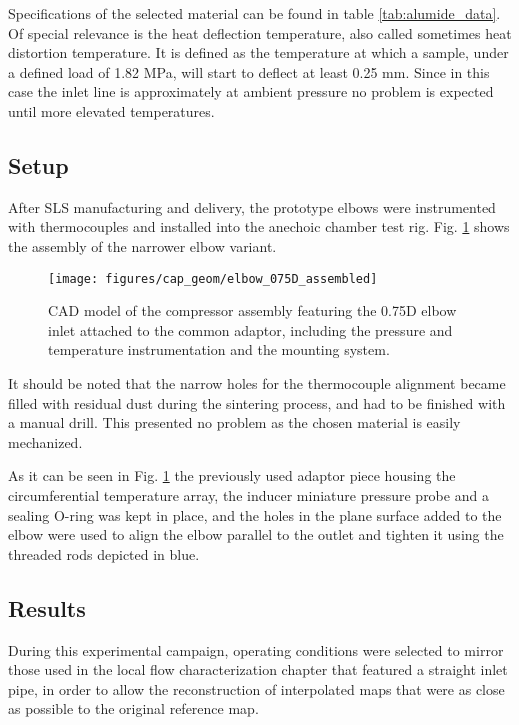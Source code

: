 Specifications of the selected material can be found in table \ref{tab:alumide_data}. Of special relevance is the heat deflection temperature, also called sometimes heat distortion temperature. It is defined as the temperature at which a sample, under a defined load of 1.82 MPa, will start to deflect at least 0.25 mm. Since in this case the inlet line is approximately at ambient pressure no problem is expected until more elevated temperatures.

\subsection{Setup}

After SLS manufacturing and delivery, the prototype elbows were instrumented with thermocouples and installed into the anechoic chamber test rig. Fig. \ref{fig:elbow_075D_assembled} shows the assembly of the narrower elbow variant.

\begin{figure}[h!]
\centering
\texttt{[image: figures/cap\_geom/elbow\_075D\_assembled]}
\caption{CAD model of the compressor assembly featuring the 0.75D elbow inlet attached to the common adaptor, including the pressure and temperature instrumentation and the mounting system.}
\label{fig:elbow_075D_assembled}
\end{figure}

It should be noted that the narrow holes for the thermocouple alignment became filled with residual dust during the sintering process, and had to be finished with a manual drill. This presented no problem as the chosen material is easily mechanized.

As it can be seen in Fig. \ref{fig:elbow_075D_assembled} the previously used adaptor piece housing the circumferential temperature array, the inducer miniature pressure probe and a sealing O-ring was kept in place, and the holes in the plane surface added to the elbow were used to align the elbow parallel to the outlet and tighten it using the threaded rods depicted in blue.

\subsection{Results}

During this experimental campaign, operating conditions were selected to mirror those used in the local flow characterization chapter that featured a straight inlet pipe, in order to allow the reconstruction of interpolated maps that were as close as possible to the original reference map.

